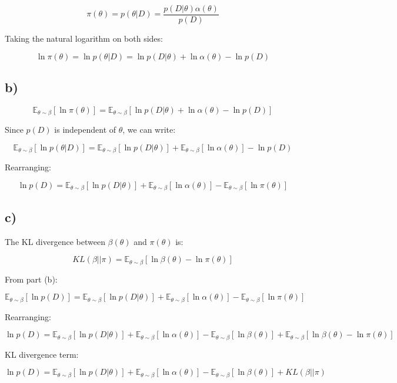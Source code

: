 \documentclass{article}
\begin{document}
\[
\pi(\theta) = p(\theta | D) = \frac{p(D | \theta) \alpha(\theta)}{p(D)}
\]

Taking the natural logarithm on both sides:

\[
\ln \pi(\theta) = \ln p(\theta | D) = \ln p(D | \theta) + \ln \alpha(\theta) - \ln p(D)
\]

\subsection*{b)}

\[
\mathbb{E}_{\theta \sim \beta} [\ln \pi(\theta)] = \mathbb{E}_{\theta \sim \beta} \left[\ln p(D | \theta) + \ln \alpha(\theta) - \ln p(D)\right]
\]

Since \( p(D) \) is independent of \( \theta \), we can write:

\[
\mathbb{E}_{\theta \sim \beta} [\ln p(\theta | D)] = \mathbb{E}_{\theta \sim \beta} [\ln p(D | \theta)] + \mathbb{E}_{\theta \sim \beta} [\ln \alpha(\theta)] - \ln p(D)
\]

Rearranging:

\[
\ln p(D) = \mathbb{E}_{\theta \sim \beta} [\ln p(D | \theta)] + \mathbb{E}_{\theta \sim \beta} [\ln \alpha(\theta)] - \mathbb{E}_{\theta \sim \beta} [\ln \pi(\theta)]
\]

\subsection*{c)}
The KL divergence between \( \beta(\theta) \) and \( \pi(\theta) \) is:

\[
KL(\beta || \pi) = \mathbb{E}_{\theta \sim \beta} \left[ \ln \beta(\theta) - \ln \pi(\theta) \right]
\]

From part (b):

\[
\mathbb{E}_{\theta \sim \beta} [\ln p(D)] = \mathbb{E}_{\theta \sim \beta} [\ln p(D | \theta)] + \mathbb{E}_{\theta \sim \beta} [\ln \alpha(\theta)] - \mathbb{E}_{\theta \sim \beta} [\ln \pi(\theta)]
\]

Rearranging:

\[
\ln p(D) = \mathbb{E}_{\theta \sim \beta} [\ln p(D | \theta)] + \mathbb{E}_{\theta \sim \beta} [\ln \alpha(\theta)] - \mathbb{E}_{\theta \sim \beta} [\ln \beta(\theta)] + \mathbb{E}_{\theta \sim \beta} [\ln \beta(\theta) - \ln \pi(\theta)]
\]

KL divergence term:

\[
\ln p(D) = \mathbb{E}_{\theta \sim \beta} [\ln p(D | \theta)] + \mathbb{E}_{\theta \sim \beta} [\ln \alpha(\theta)] - \mathbb{E}_{\theta \sim \beta} [\ln \beta(\theta)] + KL(\beta || \pi)
\]
\end{document}
